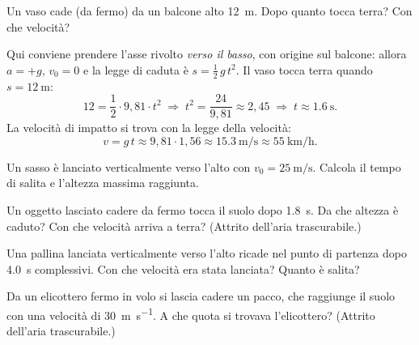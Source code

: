 \begin{testexample}
Un vaso cade (da fermo) da un balcone alto \SI{12}{\metre}. Dopo quanto tocca terra? Con che velocità?

Qui conviene prendere l'asse rivolto \emph{verso il basso}, con origine sul balcone: allora $a = +g$, $v_0 = 0$ e la legge di caduta è $s = \tfrac{1}{2}\,g\,t^2$. Il vaso tocca terra quando $s = \SI{12}{\metre}$:
\[ 12 = \frac{1}{2}\cdot 9{,}81 \cdot t^2 \;\Longrightarrow\; t^2 = \frac{24}{9{,}81} \approx 2{,}45 \;\Longrightarrow\; t \approx \SI{1,6}{\second}. \]
La velocità di impatto si trova con la legge della velocità:
\[ v = g\,t \approx 9{,}81 \cdot 1{,}56 \approx \SI{15,3}{\metre\per\second} \approx \SI{55}{\kilo\metre\per\hour}. \]
\end{testexample}

\begin{esercizio}
Un sasso è lanciato verticalmente verso l'alto con $v_0 = \SI{25}{\metre\per\second}$. Calcola il tempo di salita e l'altezza massima raggiunta.\\
\end{esercizio}

\begin{esercizio}
Un oggetto lasciato cadere da fermo tocca il suolo dopo \SI{1,8}{\second}. Da che altezza è caduto? Con che velocità arriva a terra? (Attrito dell'aria trascurabile.)\\
\end{esercizio}

\begin{esercizio}
Una pallina lanciata verticalmente verso l'alto ricade nel punto di partenza dopo \SI{4,0}{\second} complessivi. Con che velocità era stata lanciata? Quanto è salita?\\
\end{esercizio}

\begin{esercizio}
Da un elicottero fermo in volo si lascia cadere un pacco, che raggiunge il suolo con una velocità di \SI{30}{\metre\per\second}. A che quota si trovava l'elicottero? (Attrito dell'aria trascurabile.)\\
\end{esercizio}

